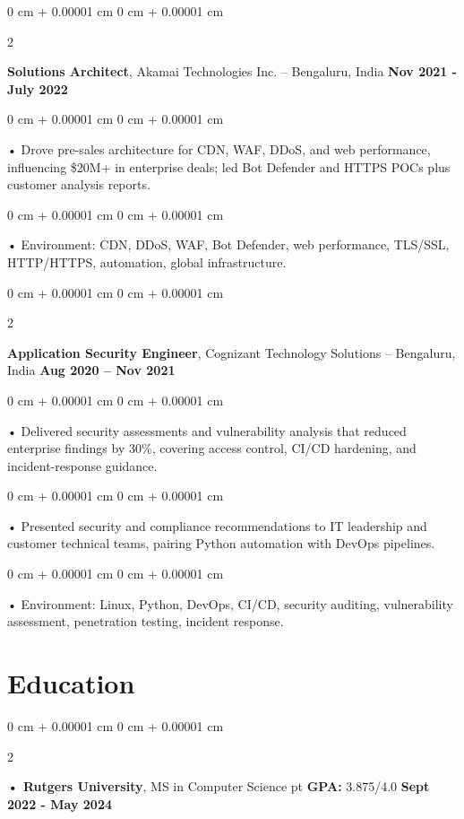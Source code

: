 \documentclass[10pt, letterpaper]{article}
\newenvironment{onecolentry}{
    \begin{adjustwidth}{
        0 cm + 0.00001 cm
    }{
        0 cm + 0.00001 cm
    }
}{
    \end{adjustwidth}
} %
\newenvironment{twocolentry}[2][]{
    \onecolentry
    \def\secondColumn{#2}
    \setcolumnwidth{\fill, 4.5 cm}
    \begin{paracol}{2}
}{
    \switchcolumn \raggedleft \secondColumn
    \end{paracol}
    \endonecolentry
} %
\begin{document}
        \begin{twocolentry}{
            \textbf{Nov 2021 - July 2022}
        }
            \textbf{Solutions Architect}, Akamai Technologies Inc. -- Bengaluru, India \end{twocolentry}
        \begin{onecolentry}
            • Drove pre-sales architecture for CDN, WAF, DDoS, and web performance, influencing \$20M+ in enterprise deals; led Bot Defender and HTTPS POCs plus customer analysis reports.
        \end{onecolentry}
        \begin{onecolentry}
             • Environment: CDN, DDoS, WAF, Bot Defender, web performance, TLS/SSL, HTTP/HTTPS, automation, global infrastructure.
        \end{onecolentry}

        \begin{twocolentry}{
            \textbf{Aug 2020 – Nov 2021}
        }
            \vspace{2 pt }
            \textbf{Application Security Engineer}, Cognizant Technology Solutions -- Bengaluru, India\end{twocolentry}
        \begin{onecolentry}
             • Delivered security assessments and vulnerability analysis that reduced enterprise findings by 30\%, covering access control, CI/CD hardening, and incident-response guidance.
        \end{onecolentry}
        \begin{onecolentry}
             • Presented security and compliance recommendations to IT leadership and customer technical teams, pairing Python automation with DevOps pipelines.
        \end{onecolentry}
        \begin{onecolentry}
             • Environment: Linux, Python, DevOps, CI/CD, security auditing, vulnerability assessment, penetration testing, incident response.
        \end{onecolentry}
    \vspace{2 pt }
        \section{Education}
        \vspace{2 pt }
        \begin{twocolentry}{
            \textbf{Sept 2022 - May 2024}
        }
            \textbf{ • Rutgers University}, MS in Computer Science  pt \textbf{GPA:} 3.875/4.0  \end{twocolentry}
\end{document}
